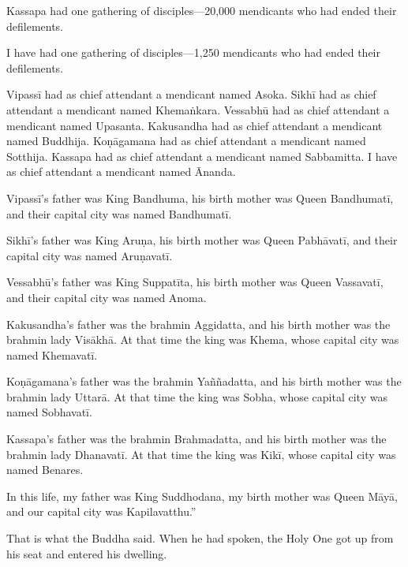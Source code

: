 \documentclass[12pt,openany]{book}%
\begin{document}
Kassapa had one gathering of disciples—20,000 mendicants who had ended their defilements. 

I have had one gathering of disciples—1,250 mendicants who had ended their defilements. 

\textsanskrit{Vipassī} had as chief attendant a mendicant named Asoka. \textsanskrit{Sikhī} had as chief attendant a mendicant named \textsanskrit{Khemaṅkara}. \textsanskrit{Vessabhū} had as chief attendant a mendicant named Upasanta. Kakusandha had as chief attendant a mendicant named Buddhija. \textsanskrit{Koṇāgamana} had as chief attendant a mendicant named Sotthija. Kassapa had as chief attendant a mendicant named Sabbamitta. I have as chief attendant a mendicant named Ānanda. 

\textsanskrit{Vipassī}’s father was King Bandhuma, his birth mother was Queen \textsanskrit{Bandhumatī}, and their capital city was named \textsanskrit{Bandhumatī}. 

\textsanskrit{Sikhī}’s father was King \textsanskrit{Aruṇa}, his birth mother was Queen \textsanskrit{Pabhāvatī}, and their capital city was named \textsanskrit{Aruṇavatī}. 

\textsanskrit{Vessabhū}’s father was King \textsanskrit{Suppatīta}, his birth mother was Queen \textsanskrit{Vassavatī}, and their capital city was named Anoma. 

Kakusandha’s father was the brahmin Aggidatta, and his birth mother was the brahmin lady \textsanskrit{Visākhā}. At that time the king was Khema, whose capital city was named \textsanskrit{Khemavatī}. 

\textsanskrit{Koṇāgamana}’s father was the brahmin \textsanskrit{Yaññadatta}, and his birth mother was the brahmin lady \textsanskrit{Uttarā}. At that time the king was Sobha, whose capital city was named \textsanskrit{Sobhavatī}. 

Kassapa’s father was the brahmin Brahmadatta, and his birth mother was the brahmin lady \textsanskrit{Dhanavatī}. At that time the king was \textsanskrit{Kikī}, whose capital city was named Benares. 

In this life, my father was King Suddhodana, my birth mother was Queen \textsanskrit{Māyā}, and our capital city was Kapilavatthu.” 

That is what the Buddha said. When he had spoken, the Holy One got up from his seat and entered his dwelling. 
\end{document}
